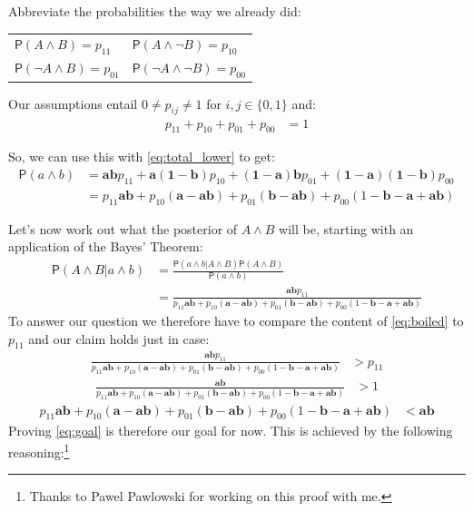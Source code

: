 \documentclass[
  10pt,
  dvipsnames,enabledeprecatedfontcommands]{scrartcl}
\newcommand{\n}{\neg}
\newcommand{\et}{\wedge}
\newcommand{\pr}[1]{\mathsf{P}(#1)}
\begin{document}
\vspace{-2mm}

Abbreviate the probabilities the way we already did:

\begin{center}
\begin{tabular}{ll}
$\pr{A\et B} = p_{11}$ & $\pr{A\et \n B} = p_{10}$\\
$\pr{\n A \et B} = p_{01}$ & $\pr{\n A \et \n B}=p_{00}$
\end{tabular}
\end{center}

Our assumptions entail \(0\neq p_{ij}\neq 1\) for \(i,j\in \{0,1\}\)
and: \begin{align}\label{eq:sumupto1}
p_{11}+p_{10}+p_{01}+p_{00}&=1
\end{align}

\noindent So, we can use this with \eqref{eq:total_lower} to get:
\begin{align}\label{eq:aetb}
\pr{a\et b} & =  \mathbf{ab}p_{11} + \mathbf{a(1-b)}p_{10}+\mathbf{(1-a)b}p_{01} + \mathbf{(1-a)(1-b)}p_{00}\\ \nonumber
& = p_{11}\mathbf{ab} + p_{10}(\mathbf{a}-\mathbf{ab}) + p_{01}(\mathbf{b}-\mathbf{ab})+p_{00}(1-\mathbf{b}-\mathbf{a}+\mathbf{ab})
\end{align}

Let's now work out what the posterior of \(A\et B\) will be, starting
with an application of the Bayes' Theorem: \begin{align} \nonumber
\pr{A\et B \vert a\et b} & = \frac{\pr{a\et b \vert A \et B}\pr{A\et B}}{\pr{a\et b}}
\\ \label{eq:boiled}
& = \frac{\mathbf{ab}p_{11}}{p_{11}\mathbf{ab} + p_{10}(\mathbf{a}-\mathbf{ab}) + p_{01}(\mathbf{b}-\mathbf{ab})+p_{00}(1-\mathbf{b}-\mathbf{a}+\mathbf{ab})}
\end{align} To answer our question we therefore have to compare the
content of \eqref{eq:boiled} to \(p_{11}\) and our claim holds just in
case: \begin{align*}
\frac{\mathbf{ab}p_{11}}{p_{11}\mathbf{ab} + p_{10}(\mathbf{a}-\mathbf{ab}) + p_{01}(\mathbf{b}-\mathbf{ab})+p_{00}(1-\mathbf{b}-\mathbf{a}+\mathbf{ab})} &> p_{11}
\end{align*} \begin{align*}
 \frac{\mathbf{ab}}{p_{11}\mathbf{ab} + p_{10}(\mathbf{a}-\mathbf{ab}) + p_{01}(\mathbf{b}-\mathbf{ab})+p_{00}(1-\mathbf{b}-\mathbf{a}+\mathbf{ab})} & > 1\end{align*}
\begin{align}  
 \label{eq:goal}
p_{11}\mathbf{ab} + p_{10}(\mathbf{a}-\mathbf{ab}) + p_{01}(\mathbf{b}-\mathbf{ab})+p_{00}(1-\mathbf{b}-\mathbf{a}+\mathbf{ab}) & < \mathbf{ab}
\end{align} Proving \eqref{eq:goal} is therefore our goal for now. This
is achieved by the following
reasoning:\footnote{Thanks to Pawel Pawlowski for working on this proof with me.}
\end{document}
